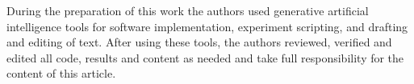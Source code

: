 During the preparation of this work the authors used generative artificial intelligence tools for software implementation, experiment scripting, and drafting and editing of text. After using these tools, the authors reviewed, verified and edited all code, results and content as needed and take full responsibility for the content of this article.
